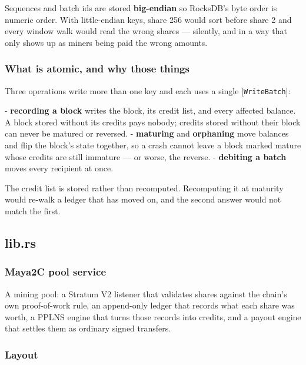 \documentclass[11pt,a4paper]{article}
\begin{document}
Sequences and batch ids are stored \textbf{big-endian} so RocksDB's byte order is
numeric order. With little-endian keys, share 256 would sort before share 2
and every window walk would read the wrong shares — silently, and in a way
that only shows up as miners being paid the wrong amounts.

\subsubsection{What is atomic, and why those things}

Three operations write more than one key and each uses a single
[\texttt{WriteBatch}]:

- \textbf{recording a block} writes the block, its credit list, and every affected
  balance. A block stored without its credits pays nobody; credits stored
  without their block can never be matured or reversed.
- \textbf{maturing} and \textbf{orphaning} move balances and flip the block's state
  together, so a crash cannot leave a block marked mature whose credits are
  still immature — or worse, the reverse.
- \textbf{debiting a batch} moves every recipient at once.

The credit list is stored rather than recomputed. Recomputing it at maturity
would re-walk a ledger that has moved on, and the second answer would not
match the first.

\subsection{lib.rs}
\subsubsection{Maya2C pool service}

A mining pool: a Stratum V2 listener that validates shares against the
chain's own proof-of-work rule, an append-only ledger that records what each
share was worth, a PPLNS engine that turns those records into credits, and a
payout engine that settles them as ordinary signed transfers.

\subsubsection{Layout}
\end{document}
